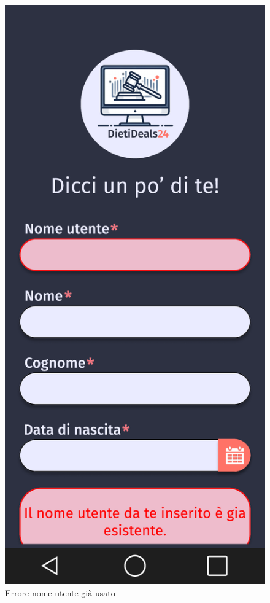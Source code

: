     \begin{figure}[!htb]
        \begin{minipage}{0.32\textwidth}
            \centering
            \includegraphics[width=.7\linewidth]{Immagini/Frames/Errori/E7.pdf}
            \caption{Errore nome utente già usato}
        \end{minipage}\hfill
        \begin{minipage}{0.32\textwidth}
            \centering

\end{minipage}
\end{figure}
